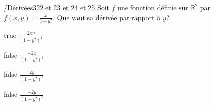             \begin{question}{/}{Dérivées}{3}{22 et 23 et 24 et 25}
                Soit $f$ une fonction définie sur $\mathbb{R}^2$ par $f(x,y)=\frac{x}{1-y^2}$. Que vaut sa dérivée par rapport à $y$?
            \end{question}
            \begin{reponses}
                \item[true] $\frac{2xy}{(1-y^2)^2}$
                \item[false] $\frac{-2x}{(1-y^2)^2}$
                \item[false] $\frac{2y}{(1-y^2)^2}$
                \item[false] $\frac{-2y}{(1-y^2)^2}$
            \end{reponses}
